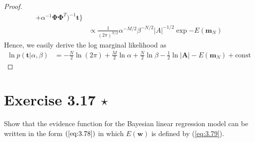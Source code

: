 \begin{proof}
\begin{align*}
                + \alpha^{-1}\mathbf{\Phi}\mathbf{\Phi}^T)^{-1}\mathbf{t}\bigg\} \\
        &\propto \frac{1}{(2\pi)^{N/2}} \alpha^{-M/2} \beta^{-N/2} |A|^{-1/2}
            \exp{-E(\mathbf{m}_N)}
    \end{align*}
    Hence, we easily derive the log marginal likelihood as
    \begin{align*}
        \ln p(\mathbf{t} | \alpha, \beta)
        &= -\frac{N}{2} \ln(2\pi) + \frac{M}{2} \ln \alpha + \frac{N}{2} \ln \beta
    - \frac{1}{2} \ln |\mathbf{A}| - E(\mathbf{m}_N) + \text{const} \tag{3.86}
    \end{align*}
\end{proof}

\section*{Exercise 3.17 $\star$}
Show that the evidence function for the Bayesian linear regression
model can be written in the form $(\ref{eq:3.78})$ in which
$E(\mathbf{w})$ is defined by (\ref{eq:3.79}).

\vspace{1em}

